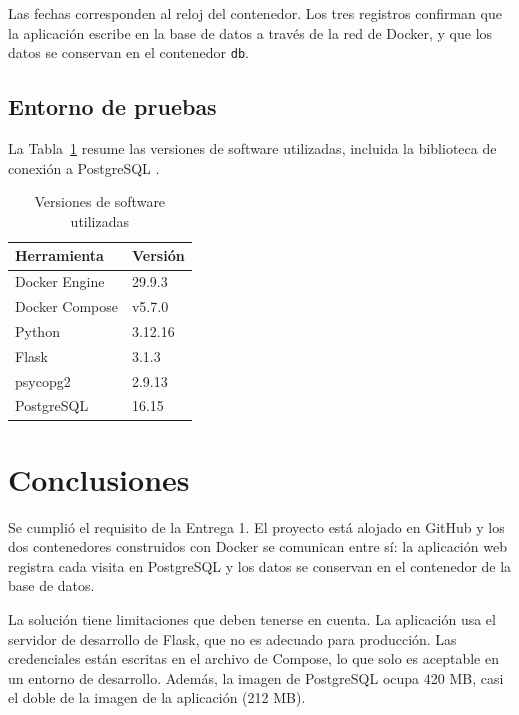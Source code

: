 \documentclass[stu,a4paper,floatsintext]{apa7}
\begin{document}
Las fechas corresponden al reloj del contenedor. Los tres registros confirman que la aplicación escribe en la base de datos a través de la red de Docker, y que los datos se conservan en el contenedor \texttt{db}.

\subsection{Entorno de pruebas}

La Tabla~\ref{tab:versiones} resume las versiones de software utilizadas, incluida la biblioteca de conexión a PostgreSQL \parencite{psycopg}.

\begin{table}[ht]
\centering
\caption{Versiones de software utilizadas}
\label{tab:versiones}
\begin{tabular}{@{}ll@{}}
\toprule
Herramienta & Versión \\
\midrule
Docker Engine & 29.9.3 \\
Docker Compose & v5.7.0 \\
Python & 3.12.16 \\
Flask & 3.1.3 \\
psycopg2 & 2.9.13 \\
PostgreSQL & 16.15 \\
\bottomrule
\end{tabular}
\end{table}

\newpage
\section{Conclusiones}

Se cumplió el requisito de la Entrega 1. El proyecto está alojado en GitHub y los dos contenedores construidos con Docker se comunican entre sí: la aplicación web registra cada visita en PostgreSQL y los datos se conservan en el contenedor de la base de datos.

La solución tiene limitaciones que deben tenerse en cuenta. La aplicación usa el servidor de desarrollo de Flask, que no es adecuado para producción. Las credenciales están escritas en el archivo de Compose, lo que solo es aceptable en un entorno de desarrollo. Además, la imagen de PostgreSQL ocupa 420 MB, casi el doble de la imagen de la aplicación (212 MB).

\newpage
\printbibliography
\end{document}
